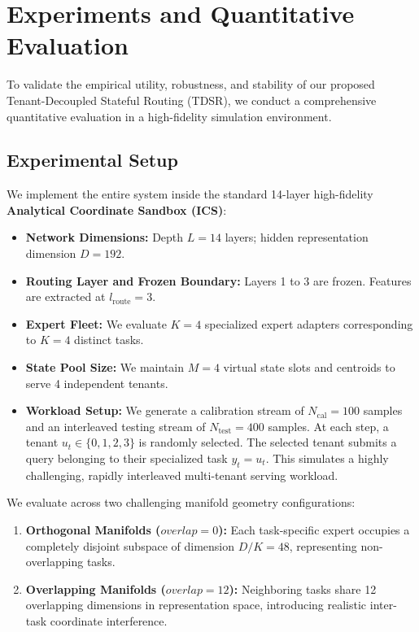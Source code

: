 \section{Experiments and Quantitative Evaluation}
\label{sec:experiments}

To validate the empirical utility, robustness, and stability of our proposed Tenant-Decoupled Stateful Routing (TDSR), we conduct a comprehensive quantitative evaluation in a high-fidelity simulation environment.

\subsection{Experimental Setup}
We implement the entire system inside the standard 14-layer high-fidelity \textbf{Analytical Coordinate Sandbox (ICS)}:
\begin{itemize}
    \item \textbf{Network Dimensions:} Depth $L = 14$ layers; hidden representation dimension $D = 192$.
    \item \textbf{Routing Layer and Frozen Boundary:} Layers 1 to 3 are frozen. Features are extracted at $l_{\text{route}} = 3$.
    \item \textbf{Expert Fleet:} We evaluate $K = 4$ specialized expert adapters corresponding to $K = 4$ distinct tasks.
    \item \textbf{State Pool Size:} We maintain $M = 4$ virtual state slots and centroids to serve 4 independent tenants.
    \item \textbf{Workload Setup:} We generate a calibration stream of $N_{\text{cal}} = 100$ samples and an interleaved testing stream of $N_{\text{test}} = 400$ samples. At each step, a tenant $u_t \in \{0, 1, 2, 3\}$ is randomly selected. The selected tenant submits a query belonging to their specialized task $y_t = u_t$. This simulates a highly challenging, rapidly interleaved multi-tenant serving workload.
\end{itemize}

We evaluate across two challenging manifold geometry configurations:
\begin{enumerate}
    \item \textbf{Orthogonal Manifolds ($overlap = 0$):} Each task-specific expert occupies a completely disjoint subspace of dimension $D/K = 48$, representing non-overlapping tasks.
    \item \textbf{Overlapping Manifolds ($overlap = 12$):} Neighboring tasks share 12 overlapping dimensions in representation space, introducing realistic inter-task coordinate interference.
\end{enumerate}

